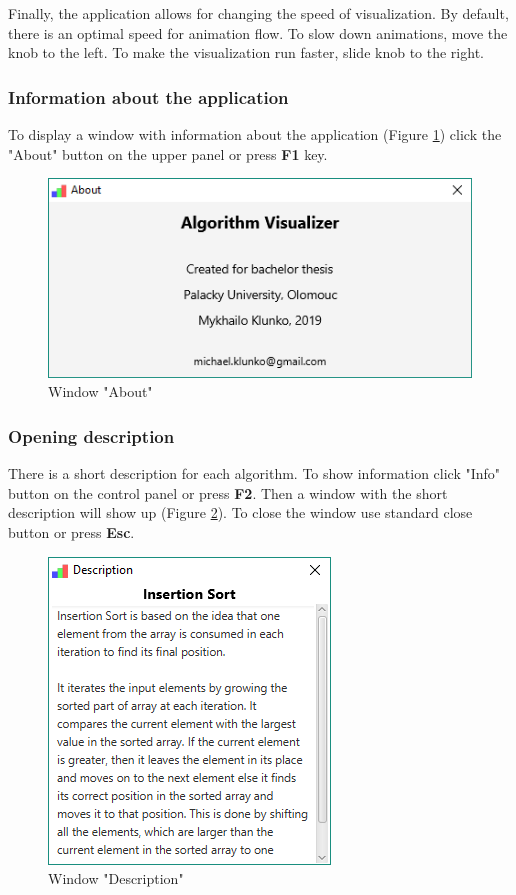 \documentclass[
  field=inf,
  biblatex,
  language=english,
  glossaries,
  theorems=false,
  sourcecodes=false,
  index
]{kidiplom}
\begin{document}
Finally, the application allows for changing the speed of visualization. By default, there is an optimal speed for animation flow. To slow down animations, move the knob to the left. To make the visualization run faster, slide knob to the right.

\subsubsection{Information about the application}

To display a window with information about the application (Figure \ref{fig:about}) click the "About" button on the upper panel or press \textbf{F1} key.

\begin{figure}[H]
\begin{center}
	\includegraphics[scale=0.7]{img/ui/WindowAbout.PNG}
	\caption{Window "About"}\label{fig:about}
\end{center}
\end{figure}

\subsubsection{Opening description}

There is a short description for each algorithm. To show information click "Info" button on the control panel or press \textbf{F2}. Then a window with the short description will show up (Figure \ref{fig:desc}). To close the window use standard close button or press \textbf{Esc}.

\begin{figure}[H]
\begin{center}
	\includegraphics[scale=0.7]{img/ui/WindowDescription.png}
	\caption{Window "Description"}\label{fig:desc}
\end{center}
\end{figure}
\end{document}
